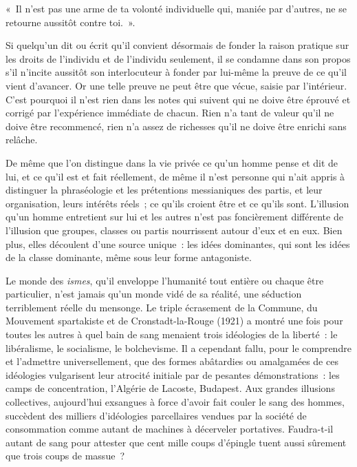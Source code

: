\documentclass[french,twoside]{book} %
\newcommand{\astermono}{\medskip\centerline{\color{rubric}\large\selectfont{\syms ✻}}\medskip\par}%
\newenvironment{quoteblock}%
  {\begin{quoting}}
  {\end{quoting}}
\newenvironment{quotebar}{%
    \def\FrameCommand{{\color{rubric!10!}\vrule width 0.5em} \hspace{0.9em}}%
    \def\OuterFrameSep{\itemsep} %
    \MakeFramed {\advance\hsize-\width \FrameRestore}
  }%
  {%
    \endMakeFramed
  }
\renewenvironment{quoteblock}%
  {%
    \savenotes
    \setstretch{0.9}
    \normalfont
    \begin{quotebar}
  }
  {%
    \end{quotebar}
    \spewnotes
  }
\begin{document}
\begin{quoteblock}
\noindent « Il n’est pas une arme de ta volonté individuelle qui, maniée par d’autres, ne se retourne aussitôt contre toi. ».\end{quoteblock}

\noindent Si quelqu’un dit ou écrit qu’il convient désormais de fonder la raison pratique sur les droits de l’individu et de l’individu seulement, il se condamne dans son propos s’il n’incite aussitôt son interlocuteur à fonder par lui-même la preuve de ce qu’il vient d’avancer. Or une telle preuve ne peut être que vécue, saisie par l’intérieur. C’est pourquoi il n’est rien dans les notes qui suivent qui ne doive être éprouvé et corrigé par l’expérience immédiate de chacun. Rien n’a tant de valeur qu’il ne doive être recommencé, rien n’a assez de richesses qu’il ne doive être enrichi sans relâche.\par

\astermono

\noindent De même que l’on distingue dans la vie privée ce qu’un homme pense et dit de lui, et ce qu’il est et fait réellement, de même il n’est personne qui n’ait appris à distinguer la phraséologie et les prétentions messianiques des partis, et leur organisation, leurs intérêts réels ; ce qu’ils croient être et ce qu’ils sont. L’illusion qu’un homme entretient sur lui et les autres n’est pas foncièrement différente de l’illusion que groupes, classes ou partis nourrissent autour d’eux et en eux. Bien plus, elles découlent d’une source unique : les idées dominantes, qui sont les idées de la classe dominante, même sous leur forme antagoniste.\par
Le monde des \emph{ismes}, qu’il enveloppe l’humanité tout entière ou chaque être particulier, n’est jamais qu’un monde vidé de sa réalité, une séduction terriblement réelle du mensonge. Le triple écrasement de la Commune, du Mouvement spartakiste et de Cronstadt-la-Rouge (1921) a montré une fois pour toutes les autres à quel bain de sang menaient trois idéologies de la liberté : le libéralisme, le socialisme, le bolchevisme. Il a cependant fallu, pour le comprendre et l’admettre universellement, que des formes abâtardies ou amalgamées de ces idéologies vulgarisent leur atrocité initiale par de pesantes démonstrations : les camps de concentration, l’Algérie de Lacoste, Budapest. Aux grandes illusions collectives, aujourd’hui exsangues à force d’avoir fait couler le sang des hommes, succèdent des milliers d’idéologies parcellaires vendues par la société de consommation comme autant de machines à décerveler portatives. Faudra-t-il autant de sang pour attester que cent mille coups d’épingle tuent aussi sûrement que trois coups de massue ?\par
\end{document}
